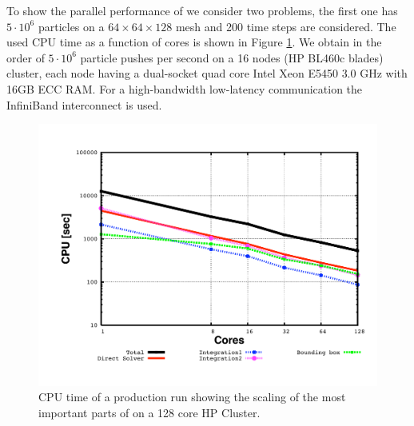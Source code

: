 \documentclass[acus]{JAC2003}
\begin{document}
To show the parallel performance of \opalt  we consider two problems, the first one has $5 \cdot 10^6$ particles on a $64 \times 64\times128$ mesh and 200 time steps are considered.
The used CPU time as a function of cores is shown in Figure \ref{fig:parperfsmall}. 
We obtain in the order of $5 \cdot 10^6$ particle pushes  per second on a 16 nodes (HP BL460c blades) cluster, each node having a dual-socket quad core Intel Xeon E5450 $3.0$ GHz with 16GB ECC RAM.
For a high-bandwidth low-latency communication the InfiniBand interconnect is used.
\begin{figure}[htb]
   \centering
  \includegraphics*[scale=0.25]{drift1}
  \vspace{-5mm}
   \caption{CPU time of a production run showing the scaling of the most important parts of \opalt on a 128 core HP Cluster.}
   \label{fig:parperfsmall}
\end{figure}
\end{document}

